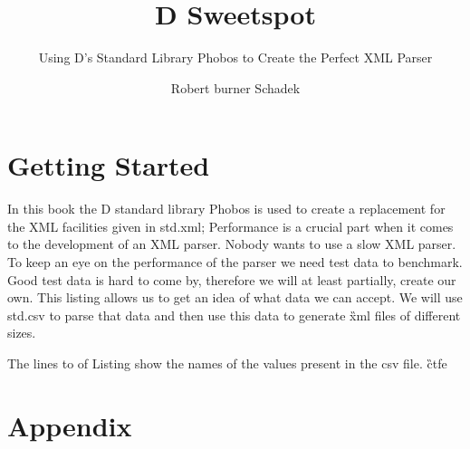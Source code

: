 \documentclass[a4paper,openright,BCOR20mm]{scrbook}
\author{Robert burner Schadek}
\title{D Sweetspot}
\subtitle{Using D's Standard Library Phobos to Create the Perfect XML Parser}
\begin{document}
\maketitle
\tableofcontents



\chapter{Getting Started}
In this book the D standard library Phobos is used to create a replacement for
the XML facilities given in std.xml;
Performance is a crucial part when it comes to the development of an XML parser.
Nobody wants to use a slow XML parser.
To keep an eye on the performance of the parser we need test data to
benchmark.
Good test data is hard to come by, therefore we will at least partially,
create our own.
This listing allows us to get an idea of what data we can accept.
We will use std.csv to parse that data and then use this data to generate
\G{xml} files of different sizes.

The lines  to 
of Listing  show the names of the values present in the csv
file.
\G{ctfe}

%
%

\chapter*{Appendix}
\appendix
{} \label{appendix}
\cleardoublepage

\label{glossary}
\printnoidxglossary

\cleardoublepage
{}\label{acronyms}
\printnoidxglossary[type=acronym]

\cleardoublepage
{}\label{figures}
\listoffigures
 
\cleardoublepage
{}\label{tables}
\listoftables

\cleardoublepage
{}\label{listings}
\lstlistoflistings

\cleardoublepage
{}\label{bibliography}
%
%
\printbibliography

\end{document}
